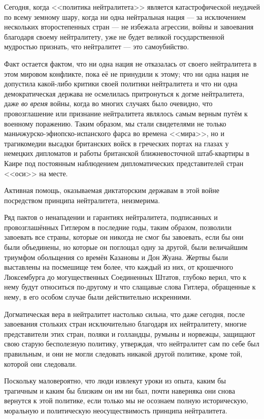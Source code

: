 Сегодня, когда <<политика нейтралитета>> является катастрофической неудачей по всему земному шару, когда ни одна нейтральная нация — за исключением нескольких второстепенных стран — не избежала агрессии, войны и завоевания благодаря своему нейтралитету, уже не будет великой государственной мудростью признать, что нейтралитет — это самоубийство.

Факт остается фактом, что ни одна нация не отказалась от своего нейтралитета в этом мировом конфликте, пока её не принудили к этому; что ни одна нация не допустила какой-либо критики своей политики нейтралитета и что ни одна демократическая держава не осмелилась притронуться к догме нейтралитета, даже \textit{во время} войны, когда во многих случаях было очевидно, что провозглашение или признание нейтралитета являлось самым верным путём к военному поражению. Таким образом, мы стали свидетелями не только маньчжурско-эфиопско-испанского фарса во времена <<мира>>, но и трагикомедии высадки британских войск в греческих портах на глазах у немецких дипломатов и работы британской ближневосточной штаб-квартиры в Каире под постоянным наблюдением дипломатических представителей стран <<оси>> на месте.

Активная помощь, оказываемая диктаторским державам в этой войне посредством принципа нейтралитета, неизмерима.

Ряд пактов о ненападении и гарантиях нейтралитета, подписанных и провозглашённых Гитлером в последние годы, таким образом, позволили завоевать все страны, которые он никогда не смог бы завоевать, если бы они были объединены, но которые он поглощал одну за другой, были величайшим триумфом обольщения со времён Казановы и Дон Жуана. Жертвы были выставлены на посмешище тем более, что каждый из них, от крошечного Люксембурга до могущественных Соединенных Штатов, глубоко верил, что к нему будут относиться по-другому и что слащавые слова Гитлера, обращенные к нему, в его особом случае были действительно искренними.

Догматическая вера в нейтралитет настолько сильна, что даже сегодня, после завоевания стольких стран исключительно благодаря их нейтралитету, многие представители этих стран, поляки и голландцы, румыны и норвежцы, защищают свою старую бесполезную политику, утверждая, что нейтралитет сам по себе был правильным, и они не могли следовать никакой другой политике, кроме той, которой они следовали.

Поскольку маловероятно, что люди извлекут уроки из опыта, каким бы трагичным и каким бы близким он им ни был, почти наверняка они снова вернутся к этой политике, если только мы не осознаем полную историческую, моральную и политическую неосуществимость принципа нейтралитета.

